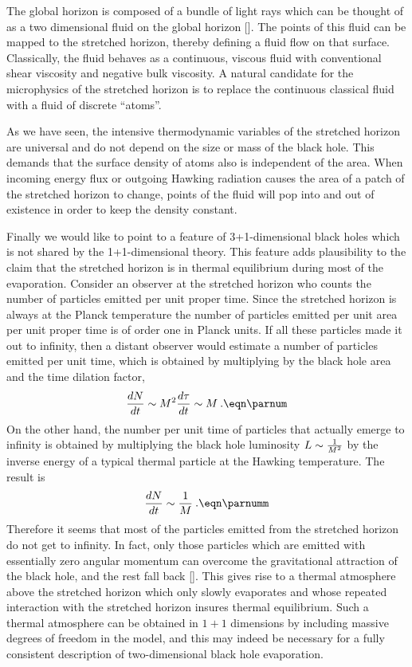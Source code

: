 The global horizon is composed of a bundle of light rays which can be
thought of as a two dimensional fluid on the global horizon
[\Mempar].  The points of this fluid can be mapped to the stretched
horizon, thereby defining a fluid flow on that surface.  Classically,
the fluid behaves as a continuous, viscous fluid with conventional
shear viscosity and negative bulk viscosity.  A natural candidate for
the microphysics of the stretched horizon is to replace the
continuous classical fluid with a fluid of discrete ``atoms''.

As we have seen, the intensive thermodynamic variables of the
stretched horizon are universal and do not depend on the size or mass
of the black hole.  This demands that the surface density of atoms
also is independent of the area.  When incoming energy flux or
outgoing Hawking radiation causes the area of a patch of the
stretched horizon to change, points of the fluid will pop into and
out of existence in order to keep the density constant.

Finally we would like to point to a feature of 3+1-dimensional black
holes which is not shared by the 1+1-dimensional theory.  This
feature adds plausibility to the claim that the stretched horizon is
in thermal equilibrium
during most of the evaporation.  Consider an observer at the
stretched horizon who counts the number of particles emitted per unit
proper time.  Since the stretched horizon is always at the Planck
temperature the number of particles emitted per unit area per unit
proper time is of order one in Planck units.  If all these particles
made it out to infinity, then a distant observer would estimate a
number of particles emitted per unit time, which is obtained by
multiplying by the black hole area and the time dilation factor,
$$
{dN\over dt}\sim  M^2 {d\tau\over dt} \sim M \>.
\eqn\parnum
$$
On the other hand, the number per unit time of particles that
actually emerge to infinity is obtained by multiplying the black hole
luminosity $L\sim {1\over M^2}$ by the inverse energy of a typical
thermal particle at the Hawking temperature.  The result is
$$
{dN\over dt}\sim {1\over M} \>.
\eqn\parnumm
$$
Therefore it seems that most of the particles emitted from the
stretched horizon do not get to infinity.  In fact, only those
particles which are emitted with essentially zero angular momentum
can overcome the gravitational attraction of the black hole, and the
rest fall back [\Mempar].  This gives rise to a thermal atmosphere
above the stretched horizon which only slowly evaporates and whose
repeated interaction with the stretched horizon insures thermal
equilibrium.  Such a thermal atmosphere can be obtained in $1+1$
dimensions by including massive degrees of freedom in the model, and
this may indeed be necessary for a fully consistent description of
two-dimensional black hole evaporation.

